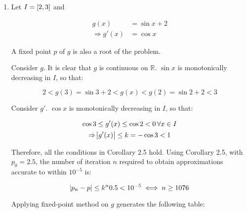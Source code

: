 \documentclass[../../../../Assignments]{subfiles}
\begin{document}
\begin{solution}
    \begin{enumerate}[label = \alph*)]
        \item Let \(I = \interval{2}{3}\) and

            \[\begin{aligned}
                             g(x) &= \sin{x} + 2 \\
                \Rightarrow g'(x) &= \cos{x}
            \end{aligned}\]

            A fixed point \(p\) of \(g\) is also a root of the problem.

            Consider \(g\). It is clear that \(g\) is continuous on
            \(\mathbb{R}\). \(\sin{x}\) is monotonically decreasing in \(I\), so
            that:

            \[2 < g(3) = \sin{3} + 2 < g(x) < g(2) = \sin{2} + 2 < 3\]

            Consider \(g'\). \(\cos{x}\) is monotonically decreasing in \(I\),
            so that:

            \begin{gather*}
                \cos{3} \leq g'(x) \leq \cos{2} < 0 \, \forall x \in I \\
                \Rightarrow \abs{g'(x)} \leq k = - \cos{3} < 1
            \end{gather*}

            Therefore, all the conditions in Corollary 2.5 hold. Using Corollary
            2.5, with \(p_0 = \num{2.5}\), the number of iteration \(n\)
            required to obtain approximations accurate to within \(10^{-5}\) is:

            \[\abs{p_n - p} \leq k^n \num{0.5} < 10^{-5} \iff n \geq 1076\]

            Applying fixed-point method on \(g\) generates the following table:


\end{enumerate}
\end{solution}
\end{document}
